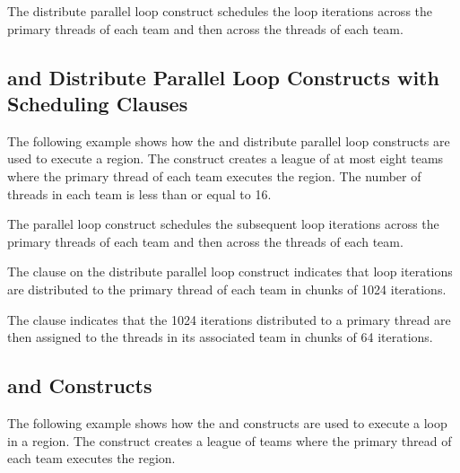 The distribute parallel loop construct schedules the loop iterations across the 
primary threads of each team and then across the threads of each team.



\subsection{  and Distribute Parallel Loop 
Constructs with Scheduling Clauses}
\label{subsec:teams_distribute_parallel_schedule}

The following example shows how the   and distribute 
parallel loop constructs are used to execute a  region. The  
construct creates a league of at most eight teams where the primary thread of each 
team executes the  region. The number of threads in each team is 
less than or equal to 16.

The  parallel loop construct schedules the subsequent loop iterations 
across the primary threads of each team and then across the threads of each team.

The  clause on the distribute parallel loop construct indicates 
that loop iterations are distributed to the primary thread of each team in chunks 
of 1024 iterations.

The  clause indicates that the 1024 iterations distributed to 
a primary thread are then assigned to the threads in its associated team in chunks 
of 64 iterations.



\subsection{  and   Constructs}
\label{subsec:teams_distribute_simd}

The following example shows how the   and  
 constructs are used to execute a loop in a  region. 
The   construct creates a league of teams where the 
primary thread of each team executes the  region.

